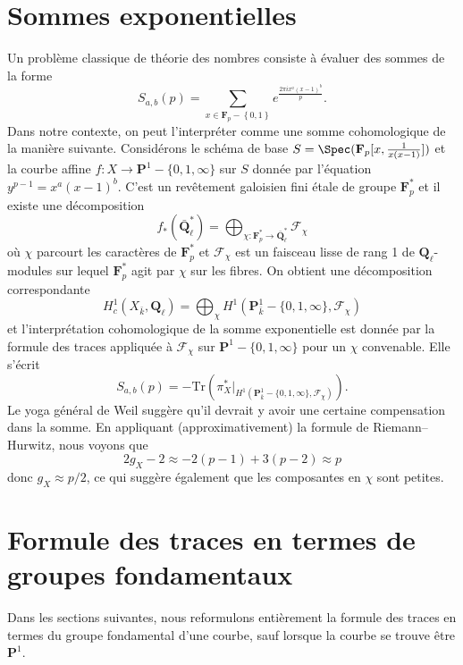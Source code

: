 \section{Sommes exponentielles}
\label{section-exponential-sums}

\noindent
Un problème classique de théorie des nombres consiste à évaluer des sommes de la forme
$$
S_{a, b}(p) = \sum_{x\in \mathbf{F}_p - \left\{0, 1\right\}} e^{\frac{2\pi
ix^a(x - 1)^b}{p}}.
$$
Dans notre contexte, on peut l'interpréter comme une somme cohomologique de la manière suivante.
Considérons le schéma de base
$S = \Spec(\mathbf{F}_p[x, \frac{1}{x(x - 1)}])$ et la courbe affine
$f : X \to \mathbf{P}^1-\{0, 1, \infty\}$ sur $S$ donnée par l'équation
$y^{p - 1} = x^a(x - 1)^b$. C'est un revêtement galoisien fini \'etale de groupe
$\mathbf{F}_p^*$ et il existe une décomposition
$$
f_*(\bar{\mathbf{Q}}_\ell^*) =
\bigoplus_{\chi : \mathbf{F}_p^*\to \bar{\mathbf{Q}}_\ell^*} \mathcal{F}_\chi
$$
où $\chi$ parcourt les caractères de $\mathbf{F}_p^*$ et
$\mathcal{F}_\chi$ est un faisceau lisse de rang 1 de $\mathbf{Q}_\ell$-modules sur lequel
$\mathbf{F}_p^*$ agit par $\chi$ sur les fibres. On obtient une décomposition correspondante
$$
H_c^1(X_{\bar k}, \mathbf{Q}_\ell) = \bigoplus_\chi H^1(\mathbf{P}_{\bar
k}^1-\{0, 1, \infty\}, \mathcal{F}_\chi)
$$
et l'interprétation cohomologique de la somme exponentielle est donnée par la
formule des traces appliquée à $\mathcal{F}_\chi$ sur $\mathbf{P}^1 - \{0, 1,
\infty\}$ pour un $\chi$ convenable. Elle s'écrit
$$
S_{a, b}(p) =
-\text{Tr}(\pi_X^*
|_{H^1(\mathbf{P}_{\bar k}^1-\{0, 1, \infty\}, \mathcal{F}_\chi)}).
$$
Le yoga général de Weil suggère qu'il devrait y avoir une certaine compensation dans la
somme. En appliquant (approximativement) la formule de Riemann--Hurwitz, nous voyons que
$$
2g_X-2 \approx -2 (p-1) + 3(p-2) \approx p
$$
donc $g_X\approx p/2$, ce qui suggère également que les composantes en $\chi$ sont petites.



\section{Formule des traces en termes de groupes fondamentaux}
\label{section-trace-formula-fundamental-group}

\noindent
Dans les sections suivantes, nous reformulons entièrement la formule des traces
en termes du groupe fondamental d'une courbe, sauf lorsque la courbe
se trouve être $\mathbf{P}^1$.




